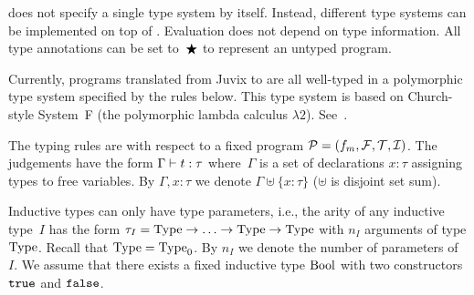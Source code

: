 \documentclass[
    9pt,            %
    techreport,        %
    affiltop,       %
]{art}
\begin{document}
\JuvixCore{} does not specify a single type system by itself. Instead,
different type systems can be implemented on top of \JuvixCore{}.
Evaluation does not depend on type information. All type annotations can be
set to~$\bigstar$ to represent an untyped program.

Currently, programs translated from Juvix to \JuvixCore{} are all
well-typed in a polymorphic type system specified by the rules below. This
type system is based on Church-style System~F (the polymorphic lambda
calculus $\lambda2$). See~\cite[Section~5]{lambda-calculi-with-types}.

The typing rules are with respect to a fixed \JuvixCore{} program $\mathcal{P} =
(f_m, \mathcal{F}, \mathcal{T}, \mathcal{I})$. The judgements have the form $\Gamma \vdash t :
\tau$ where~$\Gamma$ is a set of declarations $x : \tau$ assigning types to
free variables. By $\Gamma, x : \tau$ we denote $\Gamma \uplus \{x :
\tau\}$ ($\uplus$ is disjoint set sum).

Inductive types can only have type parameters, i.e., the arity
of any inductive type~$I$ has the form $\tau_I = \mathrm{Type} \to \ldots \to \mathrm{Type}
\to \mathrm{Type}$ with $n_I$ arguments of type $\mathrm{Type}$. Recall that $\mathrm{Type} =
\mathrm{Type}_0$. By $n_I$ we denote the number of parameters of~$I$. We assume that
there exists a fixed inductive type $\mathrm{Bool}$ with two constructors $\mathtt{true}$
and $\mathtt{false}$.
\end{document}
